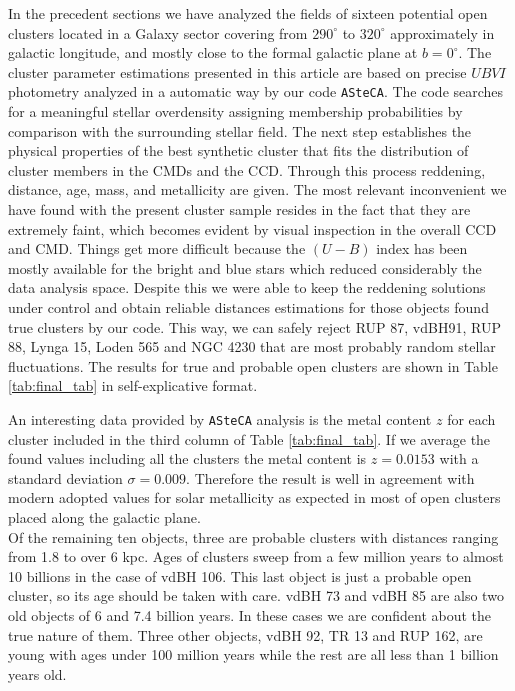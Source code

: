 \documentclass[draft]{aa}
\begin{document}
In the precedent sections we have analyzed the fields of sixteen potential
open clusters located in a Galaxy sector covering from $290^\circ$ to
$320^\circ$ approximately in galactic longitude, and mostly close to the formal
galactic plane at $b=0^\circ$.
The cluster parameter estimations presented in this article are based on
precise $UBVI$ photometry analyzed in a automatic way by
our code \texttt{ASteCA}. The code searches for a meaningful stellar overdensity
assigning membership probabilities by comparison with the surrounding stellar
field.
The next step establishes the physical properties of the best synthetic cluster
that fits the distribution of cluster members in the CMDs and the CCD.
Through this process reddening, distance, age, mass, and metallicity are
given.
The most relevant inconvenient we have found with the present cluster
sample resides in the fact that they are extremely faint, which becomes evident
by visual inspection in the overall CCD and CMD.
Things get more difficult because the $(U-B)$ index has been mostly available for
the bright and blue stars which reduced considerably the data analysis space.
Despite this we were able to keep the reddening solutions under control and
obtain reliable distances estimations for those objects found true clusters by
our code. This way, we can safely reject RUP 87, vdBH91, RUP 88, Lynga 15,
Loden 565 and NGC 4230 that are most probably random stellar fluctuations. The
results for true and probable open clusters are shown in Table 
\ref{tab:final_tab} in self-explicative format.

An interesting data provided by \texttt{ASteCA} analysis is the
metal content $z$ for each cluster included in the third column of Table 
\ref{tab:final_tab}. If we average the found values including all the clusters
the metal content is $z=0.0153$ with a standard deviation $\sigma = 0.009$.
Therefore the result is well in agreement with modern adopted values for solar
metallicity as expected in most of open clusters placed along the galactic
plane.\\

Of the remaining ten objects, three are probable clusters with distances
ranging from 1.8 to over 6 kpc. Ages of clusters sweep from a few million years
to almost 10 billions in the case of vdBH 106. This last object is just a
probable open cluster, so its age should be taken with care. vdBH 73 and
vdBH 85 are also two old objects of 6 and 7.4 billion years. In these cases we
are confident about the true nature of them. Three other objects, vdBH 92, TR 13
and RUP 162, are young with ages under 100 million years while the rest are all
less than 1 billion years old.
\end{document}
